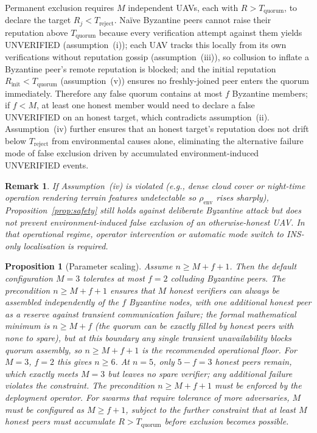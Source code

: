 \documentclass[conference,10pt]{IEEEtran}
\newtheorem{proposition}{Proposition}
\newtheorem{remark}{Remark}
\begin{document}
\begin{IEEEproof}[Sketch]
Permanent exclusion requires $M$ independent UAVs, each with $R > T_\text{quorum}$, to declare the target $R_j < T_\text{reject}$. Na\"ive Byzantine peers cannot raise their reputation above $T_\text{quorum}$ because every verification attempt against them yields UNVERIFIED (assumption~(i)); each UAV tracks this locally from its own verifications without reputation gossip (assumption~(iii)), so collusion to inflate a Byzantine peer's remote reputation is blocked; and the initial reputation $R_\text{init} < T_\text{quorum}$ (assumption~(v)) ensures no freshly-joined peer enters the quorum immediately. Therefore any false quorum contains at most $f$ Byzantine members; if $f < M$, at least one honest member would need to declare a false UNVERIFIED on an honest target, which contradicts assumption~(ii). Assumption~(iv) further ensures that an honest target's reputation does not drift below $T_\text{reject}$ from environmental causes alone, eliminating the alternative failure mode of false exclusion driven by accumulated environment-induced UNVERIFIED events.
\end{IEEEproof}

\begin{remark}
If Assumption~(iv) is violated (e.g., dense cloud cover or night-time operation rendering terrain features undetectable so $\rho_\text{env}$ rises sharply), Proposition~\ref{prop:safety} still holds against deliberate Byzantine attack but does not prevent environment-induced false exclusion of an otherwise-honest UAV. In that operational regime, operator intervention or automatic mode switch to INS-only localisation is required.
\end{remark}

\begin{proposition}[Parameter scaling]
\label{prop:scaling}
Assume $n \geq M + f + 1$. Then the default configuration $M=3$ tolerates at most $f=2$ colluding Byzantine peers. The precondition $n \geq M+f+1$ ensures that $M$ honest verifiers can always be assembled independently of the $f$ Byzantine nodes, with one additional honest peer as a reserve against transient communication failure; the formal mathematical minimum is $n \geq M + f$ (the quorum can be exactly filled by honest peers with none to spare), but at this boundary any single transient unavailability blocks quorum assembly, so $n \geq M+f+1$ is the recommended operational floor. For $M=3$, $f=2$ this gives $n \geq 6$. At $n=5$, only $5-f=3$ honest peers remain, which exactly meets $M=3$ but leaves no spare verifier; any additional failure violates the constraint. The precondition $n \geq M+f+1$ must be enforced by the deployment operator. For swarms that require tolerance of more adversaries, $M$ must be configured as $M \geq f+1$, subject to the further constraint that at least $M$ honest peers must accumulate $R > T_\text{quorum}$ before exclusion becomes possible.
\end{proposition}
\end{document}
